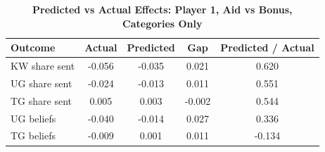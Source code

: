 \begin{table}[!htbp]
\centering
\caption{\textbf{Predicted vs Actual Effects: Player 1, Aid vs Bonus, Categories Only}}
\label{tab:cats_only_aid_vs_bonus_fullpooled_p1_fit}
\begin{tabular}{lcccc}
\toprule
Outcome & Actual & Predicted & Gap & Predicted / Actual \\
\midrule
KW share sent & -0.056 & -0.035 & 0.021 & 0.620 \\
UG share sent & -0.024 & -0.013 & 0.011 & 0.551 \\
TG share sent & 0.005 & 0.003 & -0.002 & 0.544 \\
UG beliefs & -0.040 & -0.014 & 0.027 & 0.336 \\
TG beliefs & -0.009 & 0.001 & 0.011 & -0.134 \\
\bottomrule
\end{tabular}
\end{table}
